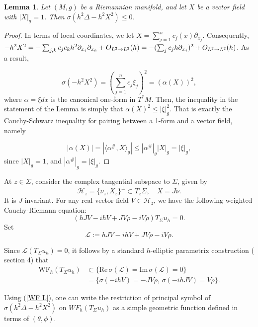 \documentclass[11pt,reqno]{amsart}
\renewcommand{\Im} {\mathrm{Im\,}}
\renewcommand{\Re} {\mathrm{Re\,}}
\newcommand{\WF}{\text{WF}}
\newtheorem{lemma}[theorem]{Lemma}
\theoremstyle{definition}
\begin{document}
\begin{lemma}\label{sum of squares}
Let $(M,g)$ be a Riemannian manifold, and let $X$ be a vector field with $|X|_g=1$. Then $\sigma(h^2\Delta-h^2X^2)\leq 0$.
\end{lemma}
\begin{proof}
    In terms of local coordinates, we let  $X=\sum_{j=1}^nc_j(x)\partial_{x_j}$. Consequently, $-h^2X^2\\=-\sum_{j,k}c_jc_kh^2\partial_{x_j}\partial_{x_k}+O_{L^2\to L^2}(h) =-(\sum_jc_jh\partial_{x_j})^2+ O_{L^2\to L^2}(h)$. As a result, 
    
    $$
    \sigma(-h^2X^2)=(\sum_{j=1}^nc_j\xi_j)^2=(\alpha(X))^2,
    $$
    where $\alpha=\xi dx$ is the canonical one-form in $T^*M$.   Then, the inequality in the statement of the Lemma is simply that $\alpha(X)^2\leq |\xi|^2_g$. That is exactly the Cauchy-Schwarz inequality for pairing between a 1-form and a vector field, namely

    $$
    |\alpha(X)|=|\langle \alpha^{\#},X\rangle_g|\leq |\alpha^{\#}|_g|X|_g=|\xi|_g,
    $$
    since $|X|_g=1$, and $|\alpha^\#|_g=|\xi|_g$.
    
\end{proof}

At $z\in \Sigma$, consider the complex tangential subspace to $\Sigma$, given by
\begin{equation}
    \mathcal{H}_z=\{\nu_z,X_z\}^\perp \subset T_{z} \Sigma,\quad X=J\nu.
\end{equation}
It is $J$-invariant. For any real vector field $V\in \mathcal{H}_z$, we have the following weighted Cauchy-Riemann equation:
\begin{equation}\label{WF L}
    (hJV-ihV+JV\rho-iV\rho)T_\Sigma u_h=0.
\end{equation}
Set 
$$ {\mathcal L}:= hJV-ihV+JV\rho-iV\rho.$$


 Since  $\mathcal{L}(T_\Sigma u_h)=0$,  it follows by a standard $h$-elliptic parametrix construction (\cite{Zw12} section 4) that
\begin{align}\label{WF new}
    \WF_h(T_\Sigma u_h)&\subset\{\Re\sigma({\mathcal L})= \Im\sigma({\mathcal L})=0\}\nonumber\\
    &=\{\sigma(-ihV)=-JV\rho,\,\sigma(-ihJV)=V\rho\}.
\end{align}

Using (\ref{WF L}), one can write the  restriction of principal symbol of $\sigma(h^2\Delta-h^2X^2)$ on $WF_h(T_{\Sigma}u_h)$ as a simple geometric function defined in terms of $(\theta,\phi).$
\end{document}
